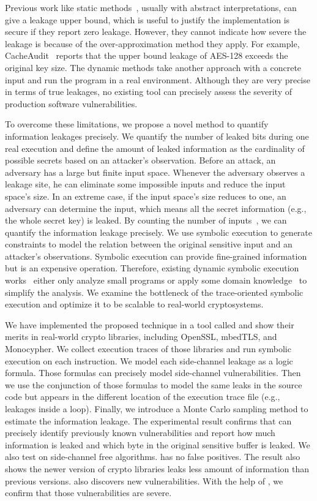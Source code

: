 Previous work like static methods~\cite{182946,5207642}, usually with
abstract interpretations, can give a leakage upper bound, which is useful to
justify the implementation is secure if they report zero leakage.
However, they cannot indicate how severe the leakage is because of the
over-approximation method they apply. For example, CacheAudit~\cite{182946} 
reports that the upper bound leakage of AES-128 exceeds the original key size. The dynamic methods take
another approach with a concrete input and run the program in a real
environment. Although they are very precise in terms of true leakages, no
existing tool can precisely assess the severity of production
software vulnerabilities. 

To overcome these limitations, we propose a novel method to quantify information 
leakages precisely. We quantify the number of leaked bits during one real 
execution and define the amount of leaked information as the cardinality of 
possible secrets based on an attacker's observation. Before an attack, an adversary has a large but finite input space. 
Whenever the adversary observes a leakage site, he can eliminate some impossible 
inputs and reduce the input space's size. In an extreme case, if the input space's size 
reduces to one, an adversary can determine the input, 
which means all the secret information (e.g., the whole secret key) is
leaked. By counting the number of  inputs~\cite{10.1007/11499107_24}, 
we can quantify the information leakage precisely.
We use symbolic execution to generate constraints to model the relation 
between the original sensitive input and an attacker's observations. 
Symbolic execution can provide fine-grained information but is an expensive
operation. Therefore, existing dynamic symbolic
execution works~\cite{203878,236338,Brotzman19Casym} either only analyze
small programs or apply some domain knowledge~\cite{203878} to simplify the analysis. We
examine the bottleneck of the trace-oriented symbolic execution and optimize it
to be scalable to real-world cryptosystems.

We have implemented the proposed technique in a tool called \tool{} and show 
their merits in real-world crypto libraries, including OpenSSL, 
mbedTLS, and Monocypher.
We collect execution traces of those libraries and run 
symbolic execution on each instruction. We model
each side-channel leakage as a logic formula. Those
formulas can precisely model side-channel vulnerabilities. 
Then we use the conjunction of those formulas to model the 
same leaks in the source code but appears in the different location of
the execution trace file (e.g., leakages inside a loop).
Finally, we introduce a Monte Carlo sampling method to estimate 
the information leakage. 
The experimental result confirms
that \tool{} can precisely identify previously known vulnerabilities and 
report how much information is leaked and which byte in the original sensitive 
buffer is leaked. We also test \tool{} on side-channel free algorithms. 
\tool{} has no false positives.
The result also shows the newer version of crypto libraries leaks less amount of information 
than previous versions.
\tool{} also discovers new vulnerabilities. With the help of \tool{}, 
we confirm that those vulnerabilities are severe.


